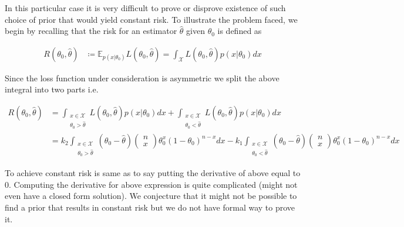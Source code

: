 In this particular case it is very difficult to prove or disprove existence of such choice of prior that would yield constant risk. To illustrate the problem faced, we begin by recalling that the risk for an estimator $\hat{\theta}$ given $\theta_0$ is defined as

\begin{align*}
    R(\theta_0, \hat{\theta}) 
    &\coloneqq \mathbb{E}_{p(x \vert \theta_0)} L(\theta_0, \hat{\theta}) = \int_\mathcal{X} L(\theta_0, \hat{\theta}) p(x|\theta_0) dx
\end{align*}

Since the loss function under consideration is asymmetric we split the above integral into two parts i.e.

\begin{align*}
    R(\theta_0, \hat{\theta}) 
    &= \int_{\substack{x \in \mathcal{X} \\ \theta_0 > \hat{\theta}}} L(\theta_0, \hat{\theta}) p(x|\theta_0) dx + \int_{\substack{x \in \mathcal{X} \\ \theta_0 < \hat{\theta}}} L(\theta_0, \hat{\theta}) p(x|\theta_0) dx \\
    &= k_2 \int_{\substack{x \in \mathcal{X} \\ \theta_0 > \hat{\theta}}} (\theta_0 - \hat{\theta}) \begin{pmatrix} n \\ x \end{pmatrix} \theta_0^{x} (1-\theta_0)^{n-x} dx - k_1\int_{\substack{x \in \mathcal{X} \\ \theta_0 < \hat{\theta}}} (\theta_0 - \hat{\theta}) \begin{pmatrix} n \\ x \end{pmatrix} \theta_0^{x} (1-\theta_0)^{n-x} dx 
\end{align*}

To achieve constant risk is same as to say putting the derivative of above equal to $0$. Computing the derivative for above expression is quite complicated (might not even have a closed form solution). We conjecture that it might not be possible to find a prior that results in constant risk but we do not have formal way to prove it.